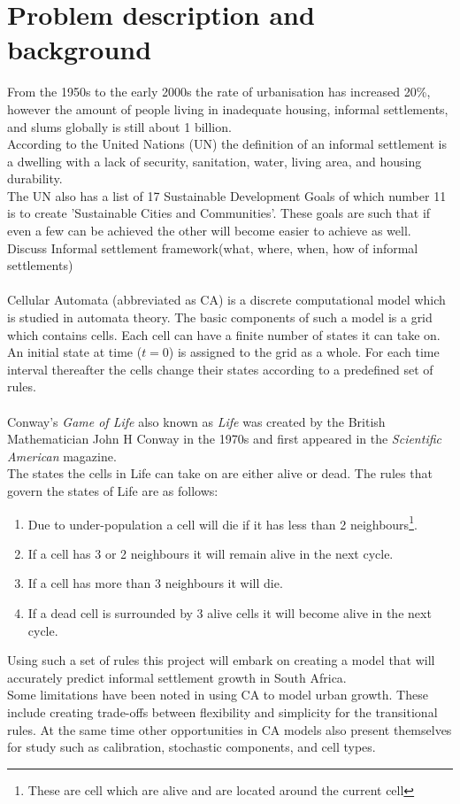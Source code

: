 \section{Problem description and background}
\label{sec:prob}
From the 1950s to the early 2000s the rate of urbanisation has increased 20\%, however the amount of people living in inadequate housing, informal settlements, and slums globally is still about 1 billion.\cite{un}\\
According to the United Nations (UN) the definition of an informal settlement is a dwelling with a lack of security, sanitation, water, living area, and housing durability.\cite{un1} \\
The UN also has a list of 17 Sustainable Development Goals of which number 11 is to create 'Sustainable Cities and Communities'. These goals are such that if even a few can be achieved the other will become easier to achieve as well.
Discuss Informal settlement framework(what, where, when, how of informal settlements)\\\\
Cellular Automata (abbreviated as CA) is a discrete computational model which is studied in automata theory. The basic components of such a model is a grid which contains cells. Each cell can have a finite number of states it can take on. An initial state at time ($t = 0$) is assigned to the grid as a whole. For each time interval thereafter the cells change their states according to a predefined set of rules.\cite{ca}\\\\
Conway's \textit{Game of Life} also known as \textit{Life} was created by the British Mathematician John H Conway in the 1970s and first appeared in the \textit{Scientific American} magazine.\cite{conway}\\
The states the cells in Life can take on are either alive or dead. The rules that govern the states of Life are as follows:
\begin{enumerate}
\item Due to under-population a cell will die if it has less than 2 neighbours\footnote{These are cell which are alive and are located around the current cell}.
\item If a cell has 3 or 2 neighbours it will remain alive in the next cycle.
\item If a cell has more than 3 neighbours it will die.
\item If a dead cell is surrounded by 3 alive cells it will become alive in the next cycle.
\end{enumerate}
Using such a set of rules this project will embark on creating a model that will accurately predict informal settlement growth in South Africa.\\
Some limitations have been noted in using CA to model urban growth. These include creating trade-offs between flexibility and simplicity for the transitional rules. At the same time other opportunities in CA models also present themselves for study such as calibration, stochastic components, and cell types.\cite{ca1}

